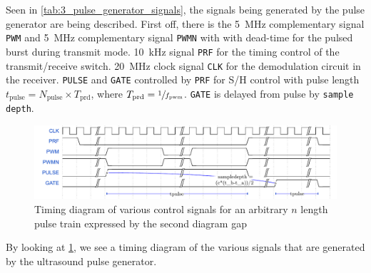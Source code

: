 Seen in \cref{tab:3_pulse_generator_signals}, the signals being generated by the pulse generator are being described. First off, there is the \qty{5}{\mega\hertz} complementary signal \texttt{PWM} and \qty{5}{\mega\hertz} complementary signal \texttt{PWMN} with with dead-time for the pulsed burst during transmit mode. \qty{10}{\kilo\hertz} signal \texttt{PRF} for the timing control of the transmit/receive switch. \qty{20}{\mega\hertz} clock signal \texttt{CLK} for the demodulation circuit in the receiver. \texttt{PULSE} and \texttt{GATE} controlled by \texttt{PRF} for S/H control with pulse length $t_{\mathrm{pulse}} = N_{\mathrm{pulse}} \times T_{\mathrm{prd}}$, where $T_{\mathrm{prd}} = \sfrac{1}{f_{\mathrm{pwm}}}$. \texttt{GATE} is delayed from pulse by \texttt{sample depth}.

\begin{figure}[htbp]
	\centering
	\includegraphics[width=\textwidth]{Figures/3_wavedrom.pdf}
	\caption{Timing diagram of various control signals for an arbitrary $n$ length pulse train expressed by the second diagram gap}
	\label{fig:3_pulse_timing_diagram}
\end{figure}
By looking at \cref{fig:3_pulse_timing_diagram}, we see a timing diagram of the various signals that are generated by the ultrasound pulse generator.

